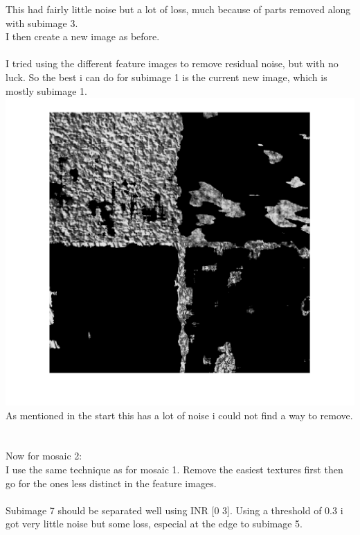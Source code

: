 \documentclass[12pt, letterpaper, twoside]{article}
\begin{document}
This had fairly little noise but a lot of loss, much because of parts removed along with subimage 3.
\ \\
I then create a new image as before.\\
\newpage
\ \\
I tried using the different feature images to remove residual noise, but with no luck.
So the best i can do for subimage 1 is the current new image, which is mostly subimage 1.\\
\includegraphics[scale=0.7]{"new_img13"}\\
As mentioned in the start this has a lot of noise i could not find a way to remove.
\ \\
\newpage
\ \\
Now for mosaic 2:\\
I use the same technique as for mosaic 1. Remove the easiest textures first then go for the ones less distinct in the feature images.\\
\ \\
Subimage 7 should be separated well using INR [0 3]. Using a threshold of 0.3 i got very little noise but some loss, especial at the edge to subimage 5.\\
\end{document}
